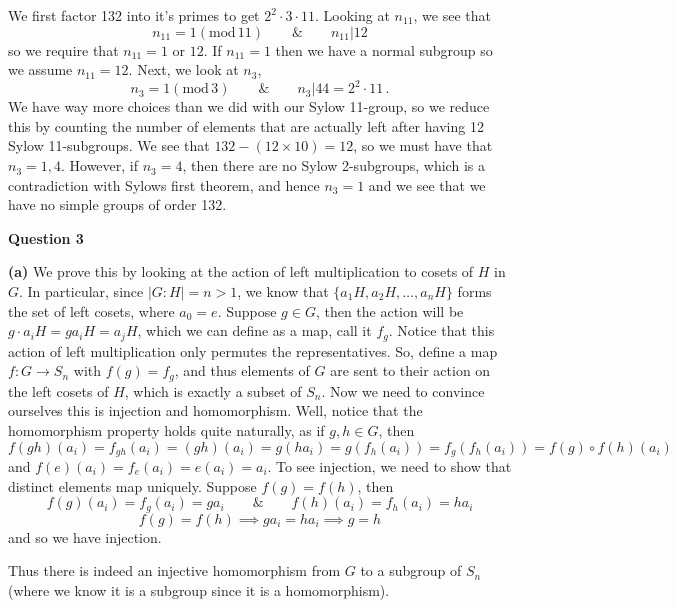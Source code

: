 \documentclass[10pt]{article}
\begin{document}
We first factor 132 into it's primes to get $2^{2}\cdot 3\cdot 11$. Looking at $n_{11}$, we see that
\[ n_{11} = 1 (\text{mod}\, 11) \hspace{2em} \& \hspace{2em} n_{11} | 12 \]
so we require that $n_{11} = 1$ or $12$. If $n_{11} = 1$ then we have a normal subgroup so we assume $n_{11} = 12$. Next, we look at $n_{3}$,
\[ n_{3} = 1 (\text{mod}\, 3) \hspace{2em} \& \hspace{2em} n_{3} | 44 = 2^{2} \cdot 11 \, .\]
We have way more choices than we did with our Sylow 11-group, so we reduce this by counting the number of elements that are actually left after having 12 Sylow 11-subgroups. We see that $132 - (12 \times 10) = 12$, so we must have that $n_{3} = 1, 4$. However, if $n_{3} = 4$, then there are no Sylow 2-subgroups, which is a contradiction with Sylows first theorem, and hence $n_{3} = 1$ and we see that we have no simple groups of order 132.

\newpage
\textbf{Question 3}

\textbf{(a)} We prove this by looking at the action of left multiplication to cosets of $H$ in $G$. In particular, since $|G:H| = n > 1$, we know that $\{a_{1}H, a_{2}H, \dots, a_{n}H \}$ forms the set of left cosets, where $a_{0} = e$. Suppose $g\in G$, then the action will be $g \cdot a_{i}H = ga_{i}H = a_{j}H$, which we can define as a map, call it $f_{g}$. Notice that this action of left multiplication only permutes the representatives. So, define a map $f: G \to S_{n}$ with $f(g) = f_{g}$, and thus elements of $G$ are sent to their action on the left cosets of $H$, which is exactly a subset of $S_{n}$. Now we need to convince ourselves this is injection and homomorphism. Well, notice that the homomorphism property holds quite naturally, as if $g,h\in G$, then
\[ f(gh)(a_{i}) = f_{gh}(a_{i}) = (gh)(a_{i}) = g(ha_{i}) = g(f_{h}(a_{i})) = f_{g}(f_{h}(a_{i})) = f(g)\circ f(h) (a_{i}) \]
and $f(e)(a_{i}) = f_{e}(a_{i}) = e(a_{i}) = a_{i}$. To see injection, we need to show that distinct elements map uniquely. Suppose $f(g) = f(h)$, then
\[ f(g)(a_{i}) = f_{g}(a_{i}) = ga_{i} \hspace{2em} \& \hspace{2em} f(h)(a_{i}) = f_{h}(a_{i}) = ha_{i} \]
\[ f(g) = f(h) \implies ga_{i} = ha_{i} \implies g = h \]
and so we have injection.

Thus there is indeed an injective homomorphism from $G$ to a subgroup of $S_{n}$ (where we know it is a subgroup since it is a homomorphism).
\end{document}

